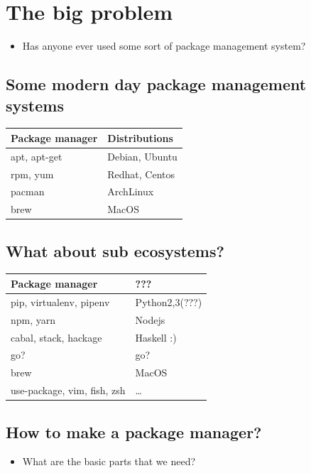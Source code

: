 \documentclass[11pt]{article}
\begin{document}
\section{The big problem}
\label{sec:orgc253152}
\begin{itemize}
\item Has anyone ever used some sort of package management system?
\end{itemize}
\subsection{Some modern day package management systems}
\label{sec:org0180067}
\begin{center}
\begin{tabular}{ll}
Package manager & Distributions\\
\hline
apt, apt-get & Debian, Ubuntu\\
rpm, yum & Redhat, Centos\\
pacman & ArchLinux\\
brew & MacOS\\
\end{tabular}
\end{center}
\subsection{What about sub ecosystems?}
\label{sec:org9bbd2b9}
\begin{center}
\begin{tabular}{ll}
Package manager & ???\\
\hline
pip, virtualenv, pipenv & Python2,3(???)\\
npm, yarn & Nodejs\\
cabal, stack, hackage & Haskell :)\\
go? & go?\\
brew & MacOS\\
use-package, vim, fish, zsh & \ldots{}\\
\end{tabular}
\end{center}
\subsection{How to make a package manager?}
\label{sec:org80702de}
\begin{itemize}
\item What are the basic parts that we need?
\end{itemize}
\end{document}
